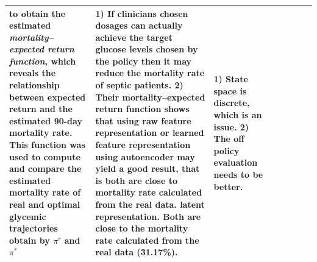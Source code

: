 \begin{table}[!th]
\begin{tabular}{|p{3 em}|p{3 em}|p{3 em}|p{3em}|p{6em}|p{10em}|p{5 em}|p{6em}|}
to obtain the estimated \textit{mortality–expected return function}, which reveals the relationship between
expected return and the estimated 90-day mortality rate. This function was used to compute and
compare the estimated mortality rate of real and optimal glycemic trajectories obtain by $\pi^r$ and $\pi^*$
& 
\textbf{1)} If clinicians chosen dosages can actually achieve the target glucose
levels chosen by the policy then it may reduce the
mortality rate of septic patients. \textbf{2)} Their mortality–expected return function shows that using raw feature representation or learned feature representation using autoencoder may yield a good result, that is both are close to mortality rate calculated from the real data.
latent representation. Both are close to the mortality rate calculated from the real data (31.17\%).
& 
\textbf{1)} State space is discrete, which is an issue. \textbf{2)} The off policy evaluation needs to be better.
   \\\midrule
\end{tabular}
\vspace*{-2em}
\end{table}   


